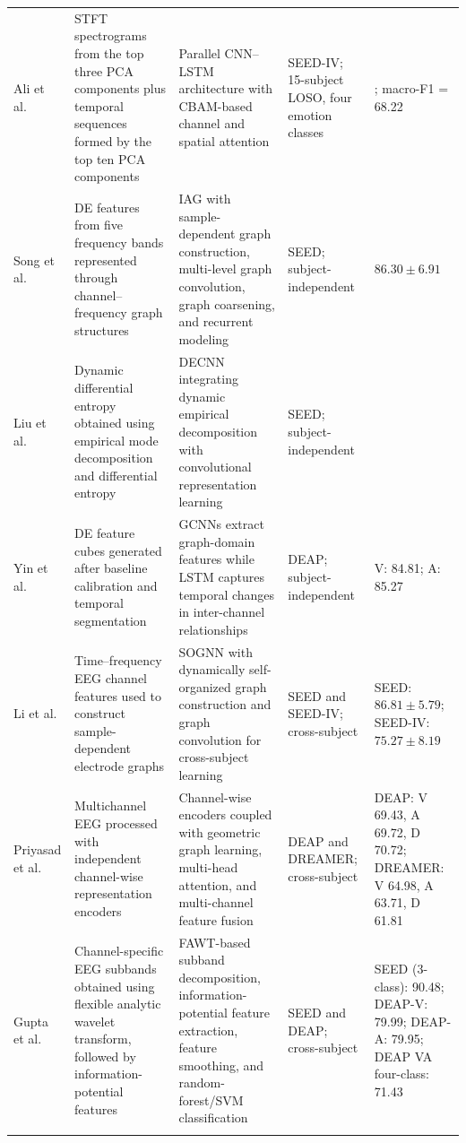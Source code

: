 \documentclass{WileyMSP-template}
\newcommand{\lightrowsep}{%
    \arrayrulecolor{lightrowgray}%
    \specialrule{0.30pt}{3.5pt}{3.5pt}%
    \arrayrulecolor{black}%
}
\begin{document}
\begin{table}
\begin{tabularx}{\textheight}{
>{\raggedright\arraybackslash}p{3.15cm}
>{\raggedright\arraybackslash}X
>{\raggedright\arraybackslash}X
>{\raggedright\arraybackslash}p{3.45cm}
>{\raggedright\arraybackslash}p{5.0cm}}
Ali et al. \cite{ali2026hybridcnnlstmcbam} &
STFT spectrograms from the top three PCA components plus temporal sequences
formed by the top ten PCA components &
Parallel CNN--LSTM architecture with CBAM-based channel and spatial attention &
SEED-IV; 15-subject LOSO, four emotion classes &
68.67; macro-F1 = 68.22 \\
\lightrowsep

Song et al. \cite{song2020iag} &
DE features from five frequency bands represented through channel--frequency graph structures &
IAG with sample-dependent graph construction, multi-level graph convolution,
graph coarsening, and recurrent modeling &
SEED; subject-independent &
$86.30 \pm 6.91$ \\
\lightrowsep

Liu et al. \cite{liu2021decnn} &
Dynamic differential entropy obtained using empirical mode decomposition
and differential entropy &
DECNN integrating dynamic empirical decomposition with convolutional representation learning &
SEED; subject-independent &
97.56 \\
\lightrowsep

Yin et al. \cite{yin2021gcnlstm} &
DE feature cubes generated after baseline calibration and temporal segmentation &
GCNNs extract graph-domain features while LSTM captures temporal changes
in inter-channel relationships &
DEAP; subject-independent &
V: 84.81;
A: 85.27 \\
\lightrowsep

Li et al. \cite{li2021sognn} &
Time--frequency EEG channel features used to construct sample-dependent electrode graphs &
SOGNN with dynamically self-organized graph construction and graph convolution
for cross-subject learning &
SEED and SEED-IV; cross-subject &
SEED: $86.81 \pm 5.79$;
SEED-IV: $75.27 \pm 8.19$ \\
\lightrowsep

Priyasad et al. \cite{priyasad2022channelwise} &
Multichannel EEG processed with independent channel-wise representation encoders &
Channel-wise encoders coupled with geometric graph learning, multi-head attention,
and multi-channel feature fusion &
DEAP and DREAMER; cross-subject &
DEAP: V 69.43, A 69.72, D 70.72;
DREAMER: V 64.98, A 63.71, D 61.81 \\
\lightrowsep

Gupta et al. \cite{gupta2019fawt} &
Channel-specific EEG subbands obtained using flexible analytic wavelet transform,
followed by information-potential features &
FAWT-based subband decomposition, information-potential feature extraction,
feature smoothing, and random-forest/SVM classification &
SEED and DEAP; cross-subject &
SEED (3-class): 90.48;
DEAP-V: 79.99;
DEAP-A: 79.95;
DEAP VA four-class: 71.43 \\
\lightrowsep


\end{tabularx}
\end{table}
\end{document}

